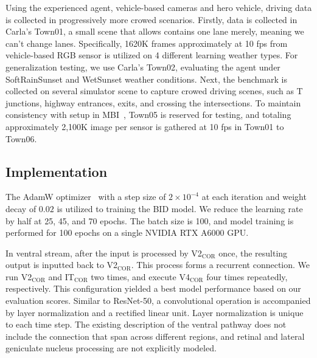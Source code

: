 Using the experienced agent, vehicle-based cameras and hero vehicle, driving data is collected in progressively more crowed scenarios.
Firstly, data is collected in Carla's Town01, a small scene that allows contains one lane merely, meaning we can't change lanes.
Specifically, 1620K frames approximately at 10 fps from vehicle-based RGB sensor is utilized on 4 different learning weather types.
For generalization testing, we use Carla's Town02, evaluating the agent under SoftRainSunset and WetSunset weather conditions. 
Next, the benchmark is collected on several simulator scene to capture crowed driving scenes, such as T junctions, highway entrances, exits, and crossing the intersections. 
To maintain consistency with setup in MBI~\cite{Hu:2022}, Town05 is reserved for testing, and totaling approximately 2,100K image per sensor is gathered at 10 fps in Town01 to Town06. 



\subsection{Implementation}

\hspace{1pc}The AdamW optimizer~\cite{loshchilov2017decoupled} with a step size of $2 \times 10^{-4}$ at each iteration and weight decay of $0.02$ is utilized to training the BID model. 
We reduce the learning rate by half at 25, 45, and 70 epochs.
The batch size is 100, 
and model training is performed for 100 epochs on a single NVIDIA RTX A6000 GPU.


In ventral stream, after the input is processed by V2$_\text{COR}$ once, the resulting output is inputted back to V2$_\text{COR}$.
This process forms a recurrent connection.
We run V2$_\text{COR}$ and IT$_\text{COR}$ two times, and execute V4$_\text{COR}$ four times repeatedly, respectively.
This configuration yielded a best model performance based on our evaluation scores.
Similar to ResNet-50, a convolutional operation is accompanied by layer normalization and a rectified linear unit.
Layer normalization is unique to each time step.
The existing description of the ventral pathway does not include the connection that span across different regions, and retinal and lateral geniculate nucleus processing are not explicitly modeled.


